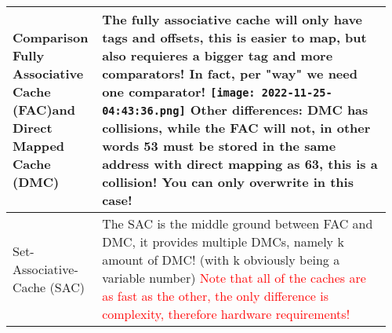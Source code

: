 \documentclass[main.tex,fontsize=8pt,paper=a4,paper=portrait,DIV=calc,]{scrartcl}
\begin{document}
\begin{table}[ht!]
\begin{tabular}{|m{0.2\linewidth}|m{0.755\linewidth}|}
\hline
Comparison Fully Associative Cache (FAC)\newline and Direct Mapped Cache (DMC) & 
The fully associative cache will only have tags and offsets, this is easier to map, but also requieres a bigger tag and more comparators!\newline
\textbf{In fact, per "way" we need one comparator!}\newline
\texttt{[image: 2022-11-25-04:43:36.png]}\newline
Other differences: \newline
DMC has collisions, while the FAC will not, in other words 53 must be stored in the same address with direct mapping as 63, this is a collision! You can only overwrite in this case!
\\
\hline
Set-Associative-Cache (SAC) & 
The SAC is the middle ground between FAC and DMC, it provides multiple DMCs, namely k amount of DMC! (with k obviously being a variable number)\newline
\textcolor{red}{Note that all of the caches are as fast as the other, the only difference is complexity, therefore hardware requirements!}\\
\hline
\end{tabular}
\end{table}
\pagebreak
\end{document}
